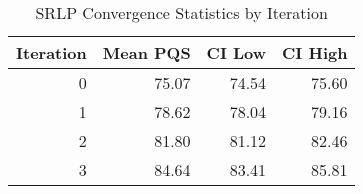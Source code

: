\begin{table}[htbp]
\centering
\caption{SRLP Convergence Statistics by Iteration}
\label{tab:convergence}
\begin{tabular}{rrrr}
\toprule
Iteration & Mean PQS & CI Low & CI High \\
\midrule
0 & 75.07 & 74.54 & 75.60 \\
1 & 78.62 & 78.04 & 79.16 \\
2 & 81.80 & 81.12 & 82.46 \\
3 & 84.64 & 83.41 & 85.81 \\
\bottomrule
\end{tabular}
\end{table}